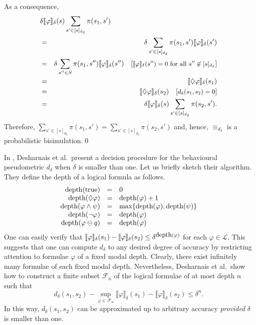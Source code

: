 \documentclass{LMCS}
\newcommand{\interpretation}[1]{\llbracket #1 \rrbracket_{\delta}}
\newcommand{\comment}[1]{\hspace{1em}\mbox{[{\small #1}]}}
\newcommand{\modality}{\lozenge}
\begin{document}
\begin{enumerate}[$\bullet$]
As a consequence,
\begin{eqnarray*}
\lefteqn{\delta \interpretation{\varphi}(s) \sum_{s' \in [s]_{d_{\delta}}} \pi(s_1, s')}\\
& = & \delta \sum_{s' \in [s]_{d_{\delta}}} \pi(s_1, s') \interpretation{\varphi}(s')\\
& = & \delta \sum_{s'' \in S} \pi(s_1, s'') \interpretation{\varphi}(s'')
\comment{$\interpretation{\varphi}(s'') = 0$ for all $s'' \not\in [s]_{d_{\delta}}$}\\
& = & \interpretation{\modality \varphi}(s_1)\\
& = & \interpretation{\modality \varphi}(s_2) 
\comment{$d_{\delta}(s_1, s_2) = 0$}\\
& = & \delta \interpretation{\varphi}(s) \sum_{s' \in [s]_{d_{\delta}}} \pi(s_2, s').
\end{eqnarray*}
Therefore, $\sum_{s' \in [s]_{d_{\delta}}} \pi(s_1, s') = \sum_{s' \in [s]_{d_{\delta}}} \pi(s_2, s')$
and, hence, $\equiv_{d_{\delta}}$ is a probabilistic bisimulation.\qed
\end{enumerate}


In \cite{DGJP99:concur}, Desharnais et al.\ present a decision procedure
for the behavioural pseudometric $d_{\delta}$ when $\delta$ is 
smaller than one.  Let us briefly sketch their algorithm.  They
define the depth of a logical formula as follows.
\begin{displaymath}
\begin{array}{rcl}
\mbox{\rm depth}(\mbox{\rm true}) & = & 0\\
\mbox{\rm depth}(\modality \varphi) & = & \mbox{\rm depth}(\varphi) + 1\\
\mbox{\rm depth}(\varphi \wedge \psi) & = & \max \{ \mbox{\rm depth}(\varphi), \mbox{\rm depth}(\psi) \}\\
\mbox{\rm depth}(\neg \varphi) & = & \mbox{\rm depth}(\varphi)\\
\mbox{\rm depth}(\varphi \ominus q) & = & \mbox{\rm depth}(\varphi)
\end{array}
\end{displaymath}
One can easily verify that 
$\interpretation{\varphi}(s_{1}) - \interpretation{\varphi}(s_{2}) \leq \delta^{\mbox{\rm \small depth}(\varphi)}$
for each $\varphi \in \mathcal{L}$.
This suggests that one can compute $d_{\delta}$ to any desired degree of 
accuracy by restricting attention to formulae $\varphi$ of a fixed modal 
depth. Clearly, there exist infinitely many formulae of each fixed modal 
depth.  Nevertheless, Desharnais et al.\ show how to construct a finite 
subset $\mathcal{F}_n$ of the logical formulae of at most depth $n$ such 
that
\begin{displaymath}
d_{\delta}(s_1, s_2) - \sup_{\varphi \in \mathcal{F}_n} \interpretation{\varphi}(s_{1}) - \interpretation{\varphi}(s_{2}) \leq \delta^n.
\end{displaymath}
In this way, $d_{\delta}(s_1, s_2)$ can be approximated up to arbitrary accuracy
\emph{provided} $\delta$ is smaller than one.
\end{document}
